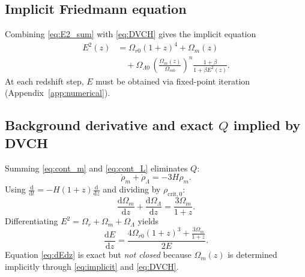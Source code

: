 \documentclass[pdflatex,sn-mathphys-num]{sn-jnl}%
\newcommand{\Omm}{\Omega_{m0}}
\newcommand{\Omr}{\Omega_{r0}}
\newcommand{\OmL}{\Omega_{\Lambda0}}
\newcommand{\Ecrit}{\rho_{\mathrm{crit},0}}
\newcommand{\dd}{\mathrm{d}}
\begin{document}
\subsection{Implicit Friedmann equation}
\label{subsec:implicit_friedmann}

Combining \eqref{eq:E2_sum} with \eqref{eq:DVCH} gives the implicit equation
\begin{equation}
\begin{aligned}
E^2(z) &= \Omr(1+z)^4 + \Omega_m(z) \\
&\quad + \OmL\,
\left(\frac{\Omega_m(z)}{\Omm}\right)^n
\frac{1+\beta}{1+\beta E^2(z)}.
\end{aligned}
\label{eq:implicit}
\end{equation}
At each redshift step, $E$ must be obtained via fixed-point iteration (Appendix~\ref{app:numerical}).

\subsection{Background derivative and exact \texorpdfstring{$Q$}{Q} implied by DVCH}
\label{subsec:Q_exact}

Summing \eqref{eq:cont_m} and \eqref{eq:cont_L} eliminates $Q$:
\begin{equation}
\dot\rho_m+\dot\rho_\Lambda = -3H\rho_m.
\end{equation}
Using $\frac{\dd}{\dd t} = -H(1+z)\frac{\dd}{\dd z}$ and dividing by $\Ecrit$:
\begin{equation}
\frac{\dd\Omega_m}{\dd z}+\frac{\dd\Omega_\Lambda}{\dd z}
=\frac{3\Omega_m}{1+z}.
\label{eq:conservation_Omegas}
\end{equation}
Differentiating $E^2=\Omega_r+\Omega_m+\Omega_\Lambda$ yields
\begin{equation}
\frac{\dd E}{\dd z}
=
\frac{4\Omr(1+z)^3 + \frac{3\Omega_m}{1+z}}{2E}.
\label{eq:dEdz}
\end{equation}
Equation \eqref{eq:dEdz} is exact but \emph{not closed} because $\Omega_m(z)$
is determined implicitly through \eqref{eq:implicit} and \eqref{eq:DVCH}.
\end{document}
